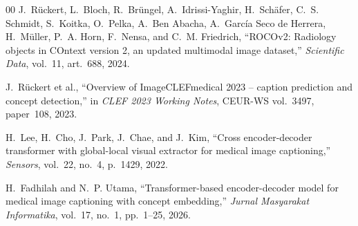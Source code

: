 \documentclass[conference]{IEEEtran}
\begin{document}
\begin{thebibliography}{00}
J.~Rückert, L.~Bloch, R.~Brüngel, A.~Idrissi-Yaghir, H.~Schäfer, C.~S. Schmidt, S.~Koitka, O.~Pelka, A.~Ben Abacha, A.~García Seco de Herrera, H.~Müller, P.~A. Horn, F.~Nensa, and C.~M. Friedrich, ``ROCOv2: Radiology objects in COntext version 2, an updated multimodal image dataset,'' \emph{Scientific Data}, vol.~11, art.~688, 2024.

J.~Rückert et al., ``Overview of ImageCLEFmedical 2023 -- caption prediction and concept detection,'' in \emph{CLEF 2023 Working Notes}, CEUR-WS vol.~3497, paper~108, 2023.

H.~Lee, H.~Cho, J.~Park, J.~Chae, and J.~Kim, ``Cross encoder-decoder transformer with global-local visual extractor for medical image captioning,'' \emph{Sensors}, vol.~22, no.~4, p.~1429, 2022.

H.~Fadhilah and N.~P. Utama, ``Transformer-based encoder-decoder model for medical image captioning with concept embedding,'' \emph{Jurnal Masyarakat Informatika}, vol.~17, no.~1, pp.~1--25, 2026.

\end{thebibliography}
\end{document}
